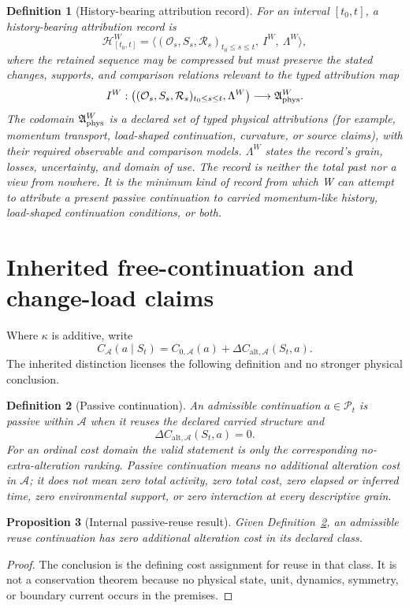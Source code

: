 \documentclass[11pt,a4paper]{article}
\newtheorem{definition}{Definition}[section]
\newtheorem{proposition}[definition]{Proposition}
\theoremstyle{remark}
\newcommand{\Alt}{\mathcal A}
\newcommand{\Hist}{\mathcal H}
\newcommand{\Obs}{\mathcal O}
\begin{document}
\begin{definition}[History-bearing attribution record]\label{def:history}
For an interval $[t_0,t]$, a \emph{history-bearing attribution record} is
\[
 \Hist^W_{[t_0,t]}=
 \langle (\Obs_s,S_s,\mathcal R_s)_{t_0\leq s\leq t},\ I^W,\ \Lambda^W\rangle,
\]
where the retained sequence may be compressed but must preserve the stated
changes, supports, and comparison relations relevant to the typed attribution
map
\[
 I^W:\bigl((\Obs_s,S_s,\mathcal R_s)_{t_0\leq s\leq t},\Lambda^W\bigr)
 \longrightarrow \mathfrak A^W_{\rm phys}.
\]
The codomain $\mathfrak A^W_{\rm phys}$ is a declared set of typed physical
attributions (for example, momentum transport, load-shaped continuation,
curvature, or source claims), with their required observable and comparison
models. $\Lambda^W$ states the record's grain, losses, uncertainty, and domain
of use. The record is neither the total past nor a view from nowhere. It is the
minimum kind of record from which W can attempt to attribute a present passive
continuation to carried momentum-like history, load-shaped continuation
conditions, or both.
\end{definition}

\section{Inherited free-continuation and change-load claims}\label{sec:inherited}
Where $\kappa$ is additive, write
\[
 C_{\Alt}(a\mid S_t)=C_{0,\Alt}(a)+\Delta C_{\mathrm{alt},\Alt}(S_t,a).
\]
The inherited distinction licenses the following definition and no stronger
physical conclusion.

\begin{definition}[Passive continuation]\label{def:pc}
An admissible continuation $a\in\mathcal P_t$ is \emph{passive within $\Alt$}
when it reuses the declared carried structure and
\[
 \Delta C_{\mathrm{alt},\Alt}(S_t,a)=0.
\]
For an ordinal cost domain the valid statement is only the corresponding
no-extra-alteration ranking. Passive continuation means no \emph{additional}
alteration cost in $\Alt$; it does not mean zero total activity, zero total
cost, zero elapsed or inferred time, zero environmental support, or zero
interaction at every descriptive grain.
\end{definition}

\begin{proposition}[Internal passive-reuse result]\label{prop:reuse}
Given Definition~\ref{def:pc}, an admissible reuse continuation has zero
additional alteration cost in its declared class.
\end{proposition}
\begin{proof}
The conclusion is the defining cost assignment for reuse in that class. It is
not a conservation theorem because no physical state, unit, dynamics, symmetry,
or boundary current occurs in the premises.
\end{proof}
\end{document}

